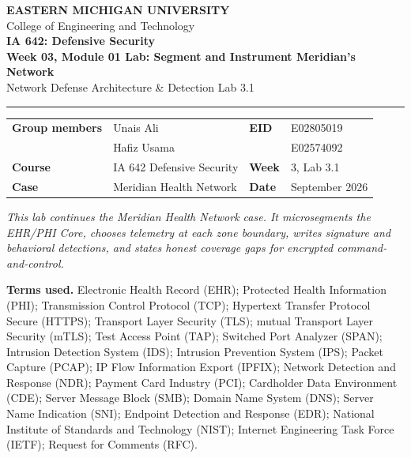 \documentclass[11pt,letterpaper]{article}
\begin{document}
\begin{center}
{\large\textbf{EASTERN MICHIGAN UNIVERSITY}}\\[0.12em]
{\normalsize College of Engineering and Technology}\\[0.25em]
{\Large\textbf{IA 642: Defensive Security}}\\[0.15em]
{\large\textbf{Week 03, Module 01 Lab: Segment and Instrument Meridian's Network}}\\[0.2em]
{\small Network Defense Architecture \& Detection \quad\textbullet\quad Lab 3.1}
\end{center}

\vspace{0.35em}\hrule\vspace{0.45em}

\begin{tabularx}{\textwidth}{@{}L{3.2cm}Y L{2.0cm}Y@{}}
\textbf{Group members} & Unais Ali & \textbf{EID} & E02805019 \\
 & Hafiz Usama &  & E02574092 \\
\textbf{Course} & IA 642 Defensive Security & \textbf{Week} & 3, Lab 3.1 \\
\textbf{Case} & Meridian Health Network & \textbf{Date} & September 2026 \\
\end{tabularx}

\vspace{0.35em}
\textit{This lab continues the Meridian Health Network case. It microsegments the EHR/PHI Core, chooses telemetry at each zone boundary, writes signature and behavioral detections, and states honest coverage gaps for encrypted command-and-control.}

{\footnotesize
\noindent\textbf{Terms used.}
Electronic Health Record (EHR);
Protected Health Information (PHI);
Transmission Control Protocol (TCP);
Hypertext Transfer Protocol Secure (HTTPS);
Transport Layer Security (TLS);
mutual Transport Layer Security (mTLS);
Test Access Point (TAP);
Switched Port Analyzer (SPAN);
Intrusion Detection System (IDS);
Intrusion Prevention System (IPS);
Packet Capture (PCAP);
IP Flow Information Export (IPFIX);
Network Detection and Response (NDR);
Payment Card Industry (PCI);
Cardholder Data Environment (CDE);
Server Message Block (SMB);
Domain Name System (DNS);
Server Name Indication (SNI);
Endpoint Detection and Response (EDR);
National Institute of Standards and Technology (NIST);
Internet Engineering Task Force (IETF);
Request for Comments (RFC).
}
\end{document}
